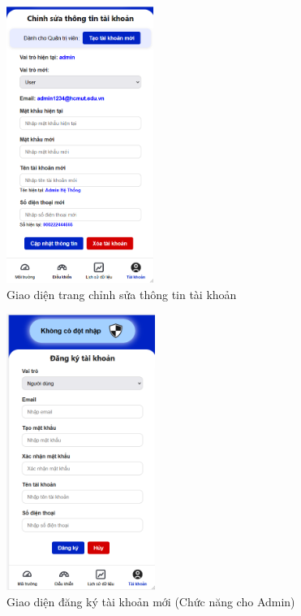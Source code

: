 \begin{minipage}{0.45\textwidth}
    \begin{figure}[H]
        \centering
        \includegraphics[height=9cm]{figures/taikhoan_chinhsua.png}
        \caption{Giao diện trang chỉnh sửa thông tin tài khoản}
        \label{fig:taikhoan_chinhsua}
    \end{figure}
\end{minipage}
\hfill
\begin{minipage}{0.45\textwidth}
    \begin{center}
        \begin{figure}[H]
            \centering
            \includegraphics[height=9cm]{figures/taikhoan_dangky.png}
            \caption{Giao diện đăng ký tài khoản mới (Chức năng cho Admin)}
            \label{fig:taikhoan_dangky}
        \end{figure}
    \end{center}
\end{minipage}